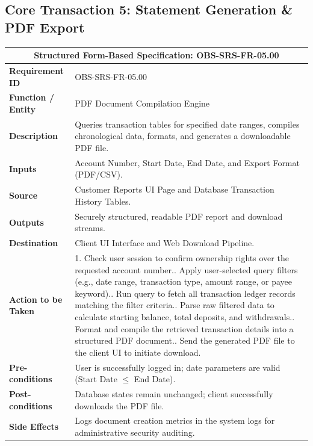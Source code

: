 \documentclass[11pt,a4paper]{article}
\begin{document}
\newpage

\subsection{Core Transaction 5: Statement Generation \& PDF Export}
\begin{center}
\small
\singlespacing
\begin{tabular}{p{4.0cm} p{11.0cm}}
\toprule
\multicolumn{2}{c}{\textbf{Structured Form-Based Specification: OBS-SRS-FR-05.00}} \\ \midrule
\textbf{Requirement ID} & OBS-SRS-FR-05.00 \\ \midrule
\textbf{Function / Entity} & PDF Document Compilation Engine \\ \midrule
\textbf{Description} & Queries transaction tables for specified date ranges, compiles chronological data, formats, and generates a downloadable PDF file. \\ \midrule
\textbf{Inputs} & Account Number, Start Date, End Date, and Export Format (PDF/CSV). \\ \midrule
\textbf{Source} & Customer Reports UI Page and Database Transaction History Tables. \\ \midrule
\textbf{Outputs} & Securely structured, readable PDF report and download streams. \\ \midrule
\textbf{Destination} & Client UI Interface and Web Download Pipeline. \\ \midrule
\textbf{Action to be Taken} & 
1. Check user session to confirm ownership rights over the requested account number.\newline
2. Apply user-selected query filters (e.g., date range, transaction type, amount range, or payee keyword).\newline
3. Run query to fetch all transaction ledger records matching the filter criteria.\newline
4. Parse raw filtered data to calculate starting balance, total deposits, and withdrawals.\newline
5. Format and compile the retrieved transaction details into a structured PDF document.\newline
6. Send the generated PDF file to the client UI to initiate download. \\ \midrule
\textbf{Pre-conditions} & User is successfully logged in; date parameters are valid (Start Date $\le$ End Date). \\ \midrule
\textbf{Post-conditions} & Database states remain unchanged; client successfully downloads the PDF file. \\ \midrule
\textbf{Side Effects} & Logs document creation metrics in the system logs for administrative security auditing. \\ \bottomrule
\end{tabular}
\end{center}
\end{document}
